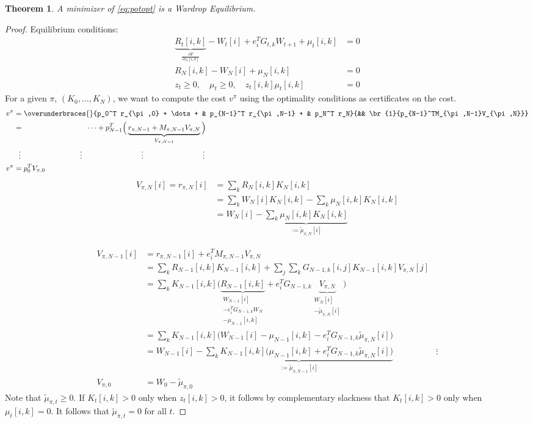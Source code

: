 \documentclass[]{article}
\newtheorem{theorem}{Theorem}
\newtheorem{proof}{Proof}
\begin{document}
\begin{theorem}
A minimizer of \eqref{eq:potopt} is a \emph{Wardrop Equilibrium}.  
\end{theorem}
\begin{proof}
Equilibrium conditions:
\begin{align}
\underbrace{R_t[i,k]}_{\frac{\partial F}{\partial z_t[i,k]}} - W_t[i] + e_i^TG_{t,k} W_{t+1} + \mu_t[i,k] & = 0 \\
R_N[i,k] - W_N[i] + \mu_N[i,k] & = 0 \\
z_t \geq 0, \quad \mu_t \geq 0, \quad z_t[i,k]\mu_t[i,k] & = 0
\end{align}
For a given $\pi$, $(K_0,\dots,K_N)$, we want to compute the cost $v^\pi$ using the optimality conditions as certificates on the cost.  
\begin{align}
v^\pi & = 
\overunderbraces{}
{p_0^T r_{\pi,0} + \dots + &  p_{N-1}^T r_{\pi,N-1}  +  & p_N^T r_N}
{&& \br{1}{p_{N-1}^TM_{\pi,N-1}V_{\pi,N}}} \\
& = \qquad \qquad \qquad \qquad \ \  \dots  
+  p_{N-1}^T \Big( \underbrace{r_{\pi,N-1} + M_{\pi,N-1} V_{\pi,N}}_{V_{\pi,N-1}}
\Big) \\
& 
\ \ \vdots \qquad \qquad \qquad \qquad \vdots  \qquad \qquad  \qquad \qquad  \vdots \qquad \qquad \qquad \qquad \vdots  \notag \\
v^\pi & = p_0^T V_{\pi,0}
\end{align}
\begin{align}
V_{\pi,N}[i] = r_{\pi,N}[i] & = \sum_k R_N[i,k]K_N[i,k] \\
& = \sum_k W_N[i] K_N[i,k] - \sum_k \mu_N[i,k] K_N[i,k] \\
& = W_N[i]  - \underbrace{\sum_k \mu_N[i,k] K_N[i,k]}_{:=\tilde{\mu}_{\pi,N}[i]}
\end{align}

\begin{align}
V_{\pi,N-1}[i] & =  r_{\pi,N-1}[i] + e_i^TM_{\pi,N-1} V_{\pi,N} \\
& = \sum_k R_{N-1}[i,k]K_{N-1}[i,k]  + \sum_j \sum_k G_{N-1,k}[i,j] K_{N-1}[i,k] V_{\pi,N}[j] \\
& = \sum_k K_{N-1}[i,k] \Bigg(
\underbrace{R_{N-1}[i,k]}
_{\substack{W_{N-1}[i] \\ - e_i^T G_{N-1,k}W_N \\ - \mu_{N-1}[i,k]}}
 + e_i^TG_{N-1,k}
 \underbrace{V_{\pi,N}}
 _{\substack{W_N[i]  \\ -  \tilde{\mu}_{\pi,N}[i]}}
 \Bigg) \\
  & = \sum_k K_{N-1}[i,k] \Bigg(W_{N-1}[i] - \mu_{N-1}[i,k]
- e_i^TG_{N-1,k} \tilde{\mu}_{\pi,N}[i] \Bigg)\\
 & = W_{N-1}[i] - 
 \underbrace{ \sum_k K_{N-1}[i,k]  \Bigg(\mu_{N-1}[i,k]
+ e_i^TG_{N-1,k} \tilde{\mu}_{\pi,N}[i]\Bigg)}_{:=\tilde{\mu}_{\pi,N-1}[i]}
& \vdots \\
V_{\pi,0} & = W_0 - \tilde{\mu}_{\pi,0}
\end{align}
Note that $\tilde{\mu}_{\pi,t} \geq 0$.  If $K_t[i,k] > 0$ only when $z_t[i,k] > 0$, it follows by complementary slackness that $K_t[i,k] > 0$ only when $\mu_t[i,k]=0$.  It follows that $\tilde{\mu}_{\pi,t} = 0$ for all $t$.  


\end{proof}
\end{document}
